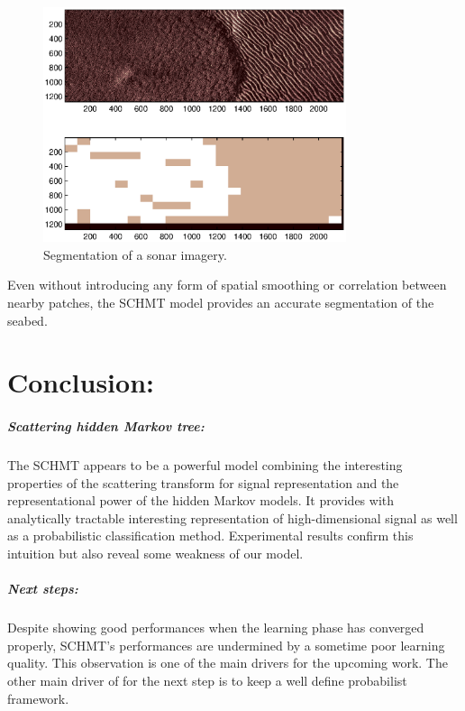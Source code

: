\documentclass[a4paper,11pt]{report}
\begin{document}
		\begin{figure}
			\begin{center}
				\includegraphics[width=3.5in]{segmentation.eps}
				\caption{Segmentation of a sonar imagery.}
				\label{fig:Segmentation}
			\end{center}
		\end{figure}
		
		Even without introducing any form of spatial smoothing or correlation between nearby patches, the SCHMT model provides an accurate segmentation of the seabed.
		
		
\chapter{Conclusion:}

  \paragraph{Scattering hidden Markov tree:}
    The SCHMT appears to be a powerful model combining the interesting properties of the scattering transform for signal representation and the representational power of the hidden Markov models. It provides with analytically tractable interesting representation of high-dimensional signal as well as a probabilistic classification method. Experimental results confirm this intuition but also reveal some weakness of our model.\\
    
    
    
    
  \paragraph{Next steps:}
		Despite showing good performances when the learning phase has converged properly, SCHMT's performances are undermined by a sometime poor learning quality. This observation is one of the main drivers for the upcoming work. The other main driver of for the next step is to keep a well define probabilist framework.\\
		
\end{document}
